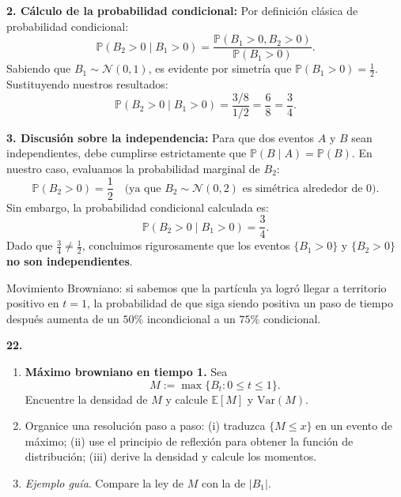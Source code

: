 \documentclass[11pt, letterpaper]{article}
\begin{document}
\begin{solucion}
    \textbf{2. Cálculo de la probabilidad condicional:}
    Por definición clásica de probabilidad condicional:
    $$ \mathbb{P}(B_2 > 0 \mid B_1 > 0) = \frac{\mathbb{P}(B_1 > 0, B_2 > 0)}{\mathbb{P}(B_1 > 0)}. $$
    Sabiendo que $B_1 \sim \mathcal{N}(0,1)$, es evidente por simetría que $\mathbb{P}(B_1 > 0) = \frac{1}{2}$.
    Sustituyendo nuestros resultados:
    $$ \mathbb{P}(B_2 > 0 \mid B_1 > 0) = \frac{3/8}{1/2} = \frac{6}{8} = \frac{3}{4}. $$

    \textbf{3. Discusión sobre la independencia:}
    Para que dos eventos $A$ y $B$ sean independientes, debe cumplirse estrictamente que $\mathbb{P}(B \mid A) = \mathbb{P}(B)$.
    En nuestro caso, evaluamos la probabilidad marginal de $B_2$:
    $$ \mathbb{P}(B_2 > 0) = \frac{1}{2} \quad \text{(ya que } B_2 \sim \mathcal{N}(0,2) \text{ es simétrica alrededor de 0)}. $$
    Sin embargo, la probabilidad condicional calculada es:
    $$ \mathbb{P}(B_2 > 0 \mid B_1 > 0) = \frac{3}{4}. $$
    Dado que $\frac{3}{4} \neq \frac{1}{2}$, concluimos rigurosamente que los eventos $\{B_1 > 0\}$ y $\{B_2 > 0\}$ \textbf{no son independientes}. 
    
    Movimiento Browniano: si sabemos que la partícula ya logró llegar a territorio positivo en $t=1$, la probabilidad de que siga siendo positiva un paso de tiempo después aumenta de un $50\%$ incondicional a un $75\%$ condicional.
\end{solucion}

\newpage

\begin{ejercicio}
    \textbf{22.} 
    \begin{enumerate}
        \item \textbf{Máximo browniano en tiempo 1.} Sea
        \[ M := \max\{B_t : 0 \le t \le 1\}. \]
        Encuentre la densidad de $M$ y calcule $\mathbb{E}[M]$ y $\text{Var}(M)$.
        \item Organice una resolución paso a paso: (i) traduzca $\{M \le x\}$ en un evento de máximo; (ii) use el principio de reflexión para obtener la función de distribución; (iii) derive la densidad y calcule los momentos.
        \item \textit{Ejemplo guía}. Compare la ley de $M$ con la de $|B_1|$.
    \end{enumerate}
\end{ejercicio}

\vspace{5mm}
\end{document}
